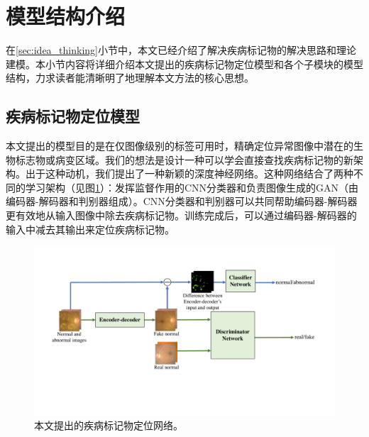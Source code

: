 \section{模型结构介绍}\label{sec:model_architecture_intro}
在\ref{sec:idea_thinking}小节中，本文已经介绍了解决疾病标记物的解决思路和理论建模。本小节内容将详细介绍本文提出的疾病标记物定位模型和各个子模块的模型结构，力求读者能清晰明了地理解本文方法的核心思想。


\subsection{疾病标记物定位模型}\label{subsec:model_architecture}
本文提出的模型目的是在仅图像级别的标签可用时，精确定位异常图像中潜在的生物标志物或病变区域。我们的想法是设计一种可以学会直接查找疾病标记物的新架构。出于这种动机，我们提出了一种新颖的深度神经网络。这种网络结合了两种不同的学习架构（见图\ref{fig:our_model_architecture}）：发挥监督作用的CNN分类器和负责图像生成的GAN（由编码器-解码器和判别器组成）。CNN分类器和判别器可以共同帮助编码器-解码器更有效地从输入图像中除去疾病标记物。训练完成后，可以通过编码器-解码器的输入中减去其输出来定位疾病标记物。
\begin{figure}[h]
	\centering
	\includegraphics[width=1.0\textwidth]{figure/method.pdf}
	\caption[本文提出的疾病标记物定位网络]{本文提出的疾病标记物定位网络。} 
	\label{fig:our_model_architecture}
\end{figure}
